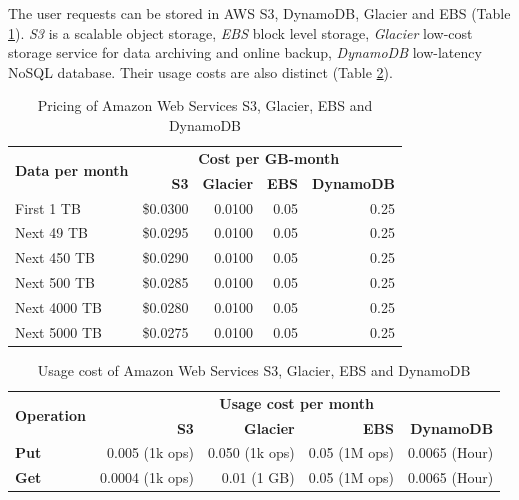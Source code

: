 The user requests can be stored in \ac{AWS} \ac{S3}, DynamoDB, Glacier and \ac{EBS} (Table \ref{tab:s3Cost}). \emph{S3} is a scalable object storage, \emph{EBS} block level storage, \emph{Glacier} low-cost storage service for data archiving and online backup, \emph{DynamoDB} low-latency \acs{NoSQL} database. Their usage costs are also distinct (Table \ref{tab:s3Cost:usage}).

 \begin{table}[h]
 \centering
 \begin{tabular}{l|rrrr}
 \multirow{2}{*}{\textbf{Data per month}} & \multicolumn{4}{c}{\textbf{Cost  per GB-month}} \\
                    & \textbf{S3}    & \textbf{Glacier}    & \textbf{EBS}     & \textbf{DynamoDB}   \\ \hline
    First 1 TB      & \$0.0300       & 0.0100              & 0.05             & 0.25 \\
    Next 49 TB      & \$0.0295       & 0.0100              & 0.05             & 0.25 \\
    Next 450 TB     & \$0.0290       & 0.0100              & 0.05             & 0.25 \\
    Next 500 TB     & \$0.0285       & 0.0100              & 0.05             & 0.25 \\
    Next 4000 TB    & \$0.0280       & 0.0100              & 0.05             & 0.25 \\
    Next 5000 TB    & \$0.0275       & 0.0100              & 0.05             & 0.25 \\
    \end{tabular}
    \caption{Pricing of Amazon Web Services S3, Glacier, EBS and DynamoDB}
    \label{tab:s3Cost}
\end{table}


\begin{table}[ht]
\centering
\begin{tabular}{l|rrrr}
\multirow{2}{*}{\textbf{Operation}} & \multicolumn{4}{c}{\textbf{Usage cost per month}}                                          \\
                                    & \textbf{S3}     & \textbf{Glacier}                   & \textbf{EBS}  & \textbf{DynamoDB} \\ \hline
\textbf{Put}                        & 0.005 (1k ops)  & \multicolumn{1}{r}{0.050 (1k ops)} & 0.05 (1M ops) & 0.0065 (Hour)     \\
\textbf{Get}                        & 0.0004 (1k ops) & 0.01 (1 GB)                        & 0.05 (1M ops) & 0.0065 (Hour)    
\end{tabular}
\caption{Usage cost of Amazon Web Services S3, Glacier, \ac{EBS} and DynamoDB}
\label{tab:s3Cost:usage}
\end{table}


